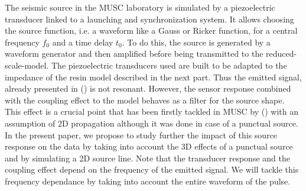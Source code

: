 \documentclass[extra,mreferee]{gji}
\begin{document}
The seismic source in the MUSC laboratory is simulated by a piezoelectric transducer linked to a launching and synchronization system. It allows choosing the source function, i.e. a waveform like a Gauss or Ricker function, for a central frequency $f_{0}$ and a time delay $t_{0}$. To do this, the source is generated by a waveform generator and then amplified before being transmitted to the reduced-scale-model. The piezoelectric transducers used are built to be adapted to the impedance of the resin model described in the next part. Thus the emitted signal, already presented in (\cite{bretaudeau2011ssm}) is not resonant. However, the sensor response combined with the coupling effect to the model behaves as a filter for the source shape. This effect is a crucial point that has been firstly tackled in MUSC by (\cite{bretaudeau2011ssm}) with an assumption of 2D propagation although it was done in case of a punctual source. In the present paper, we propose to study further the impact of this source response on the data by taking into account the 3D effects of a punctual source and by simulating a 2D source line. Note that the transducer response and the coupling effect depend on the frequency of the emitted signal. We will tackle this frequency dependance by taking into account the entire waveform of the pulse.
\end{document}
